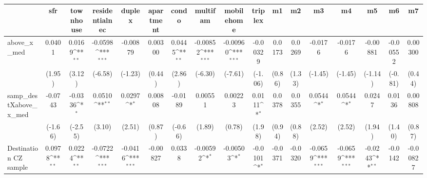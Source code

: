 \begin{table}[htbp]\centering
\def\sym#1{\ifmmode^{#1}\else\(^{#1}\)\fi}
\caption{ \label{tab1}}
\begin{tabular}{l*{16}{c}}
\toprule
                    &\multicolumn{1}{c}{sfr}&\multicolumn{1}{c}{townhouse}&\multicolumn{1}{c}{residentialnec}&\multicolumn{1}{c}{duplex}&\multicolumn{1}{c}{apartment}&\multicolumn{1}{c}{condo}&\multicolumn{1}{c}{multifam}&\multicolumn{1}{c}{mobilehome}&\multicolumn{1}{c}{triplex}&\multicolumn{1}{c}{m1}&\multicolumn{1}{c}{m2}&\multicolumn{1}{c}{m3}&\multicolumn{1}{c}{m4}&\multicolumn{1}{c}{m5}&\multicolumn{1}{c}{m6}&\multicolumn{1}{c}{m7}\\
\midrule
above\_x\_med         &      0.0401         &      0.0169\sym{**} &     -0.0598\sym{***}&    -0.00879         &     0.00300         &      0.0445\sym{**} &    -0.00852\sym{***}&    -0.00960\sym{***}&    -0.00329         &      0.0173         &      0.0269         &     -0.0176         &     -0.0176         &    -0.00881         &    -0.00552         &     0.00300         \\
                    &      (1.95)         &      (3.12)         &     (-6.58)         &     (-1.23)         &      (0.44)         &      (2.86)         &     (-6.30)         &     (-7.61)         &     (-1.06)         &      (0.86)         &      (1.33)         &     (-1.45)         &     (-1.45)         &     (-1.14)         &     (-0.81)         &      (0.44)         \\
\addlinespace
samp\_destXabove\_x\_med&     -0.0743         &     -0.0336\sym{*}  &      0.0510\sym{**} &      0.0297\sym{*}  &     0.00808         &     -0.0189         &     0.00551         &     0.00223         &      0.0111\sym{*}  &      0.0378         &      0.0355         &      0.0544\sym{*}  &      0.0544\sym{*}  &      0.0247         &      0.0136         &     0.00808         \\
                    &     (-1.66)         &     (-2.55)         &      (3.10)         &      (2.51)         &      (0.87)         &     (-0.66)         &      (1.89)         &      (0.78)         &      (1.98)         &      (0.94)         &      (0.88)         &      (2.52)         &      (2.52)         &      (1.94)         &      (1.40)         &      (0.87)         \\
\addlinespace
Destination CZ sample&      0.0978\sym{**} &      0.0224\sym{**} &     -0.0722\sym{***}&     -0.0416\sym{***}&    -0.00827         &      0.0338         &    -0.00592\sym{*}  &    -0.00503\sym{*}  &     -0.0101\sym{*}  &     -0.0371         &     -0.0320         &     -0.0659\sym{***}&     -0.0659\sym{***}&     -0.0243\sym{**} &     -0.0142         &    -0.00827         \\

\end{tabular}
\end{table}
